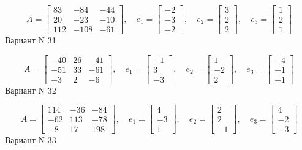 \documentclass[11pt]{report}
\begin{document}
$$A = \left[\begin{matrix}83 & -84 & -44\\20 & -23 & -10\\112 & -108 & -61\end{matrix}\right],\quad e_1 = \left[\begin{matrix}-2\\-3\\-2\end{matrix}\right],\quad e_2 = \left[\begin{matrix}3\\2\\2\end{matrix}\right],\quad e_3 = \left[\begin{matrix}1\\2\\1\end{matrix}\right]$$Вариант N 31

$$A = \left[\begin{matrix}-40 & 26 & -41\\-51 & 33 & -61\\-3 & 2 & -6\end{matrix}\right],\quad e_1 = \left[\begin{matrix}-1\\3\\-3\end{matrix}\right],\quad e_2 = \left[\begin{matrix}1\\-2\\2\end{matrix}\right],\quad e_3 = \left[\begin{matrix}-4\\-1\\-1\end{matrix}\right]$$Вариант N 32

$$A = \left[\begin{matrix}114 & -36 & -84\\-62 & 113 & -78\\-8 & 17 & 198\end{matrix}\right],\quad e_1 = \left[\begin{matrix}4\\-3\\1\end{matrix}\right],\quad e_2 = \left[\begin{matrix}2\\2\\-1\end{matrix}\right],\quad e_3 = \left[\begin{matrix}4\\-2\\-3\end{matrix}\right]$$Вариант N 33
\end{document}

